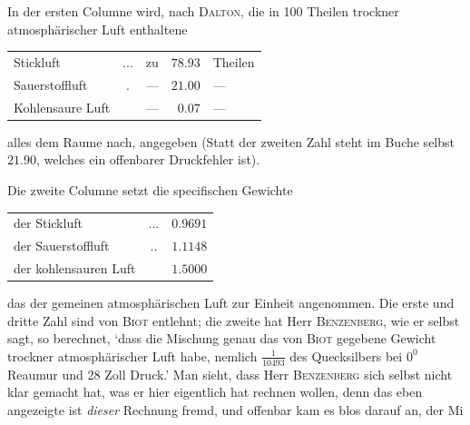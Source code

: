 In der ersten Columne wird, nach \textsc{Dalton}, die in 100 Theilen trockner atmosphärischer Luft enthaltene
\begin{center}
\begin{tabular}{lclrl}
Stickluft & .\quad .\quad . & zu & $78.93$ & Theilen\\
Sauerstoffluft & . & — & $21.00$ & —\\
Kohlensaure Luft & & — & $0.07$ & —
\end{tabular}
\end{center}
alles dem Raume nach, angegeben (Statt der zweiten Zahl steht im Buche selbst $21.90$, welches ein offenbarer Druckfehler ist).

Die zweite Columne setzt die specifischen Gewichte
\begin{center}
\begin{tabular}{lcr}
der Stickluft & .\quad .\quad . & $0.9691$\\
der Sauerstoffluft & .\quad . & $1.1148$\\
der kohlensauren Luft & & $1.5000$
\end{tabular}
\end{center}
das der gemeinen atmosphärischen Luft zur Einheit angenommen. Die erste und dritte Zahl sind von \textsc{Biot} entlehnt; die zweite hat Herr \textsc{Benzenberg}, wie er selbst sagt, so berechnet, `dass die Mischung genau das von \textsc{Biot} gegebene Gewicht trockner atmosphärischer Luft habe, nemlich $\frac{1}{10493}$ des Quecksilbers bei $0^0$ Reaumur und 28 Zoll Druck.' Man sieht, dass Herr \textsc{Benzenberg} sich selbst nicht klar gemacht hat, was er hier eigentlich hat rechnen wollen, denn das eben angezeigte ist \textit{dieser} Rechnung fremd, und offenbar kam es blos darauf an, der Mi%
